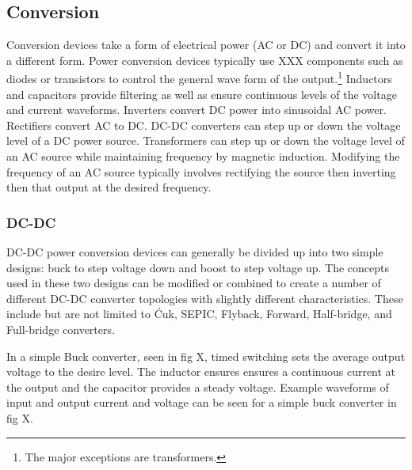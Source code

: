 \subsection{Conversion}
Conversion devices take a form of electrical power (AC or DC) and convert it into a different form. Power conversion devices typically use XXX components such as diodes or transistors to control the general wave form of the output.\footnote{The major exceptions are transformers.} Inductors and capacitors provide filtering as well as ensure continuous levels of the voltage and current waveforms. Inverters convert DC power into sinusoidal AC power. Rectifiers convert AC to DC. DC-DC converters can step up or down the voltage level of a DC power source. Transformers can step up or down the voltage level of an AC source while maintaining frequency by magnetic induction. Modifying the frequency of an AC source typically involves rectifying the source then inverting then that output at the desired frequency. 

\subsubsection{DC-DC}
DC-DC power conversion devices can generally be divided up into two simple designs: buck to step voltage down and boost to step voltage up. The concepts used in these two designs can be modified or combined to create a number of different DC-DC converter topologies with slightly different characteristics. These include but are not limited to \'Cuk, SEPIC, Flyback, Forward, Half-bridge, and Full-bridge converters.

In a simple Buck converter, seen in fig X, timed switching sets the average output voltage to the desire level. The inductor ensures ensures a continuous current at the output and the capacitor provides a steady voltage. Example waveforms of input and output current and voltage can be seen for a simple buck converter in fig X.


